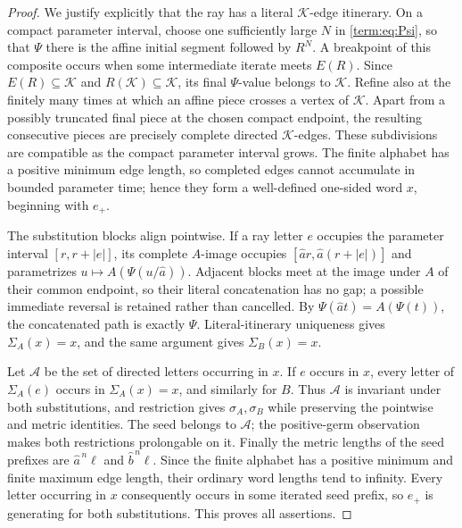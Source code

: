 \documentclass[11pt]{article}
\theoremstyle{definition}
\theoremstyle{remark}
\begin{document}
\begin{proof}
We justify explicitly that the ray has a literal \(\mathcal K\)-edge
itinerary.  On a compact parameter interval, choose one sufficiently large
\(N\) in \eqref{term:eq:Psi}, so that \(\Psi\) there is the affine initial
segment followed by \(R^N\).  A breakpoint of this composite occurs when
some intermediate iterate meets \(E(R)\).  Since
\(E(R)\subseteq\mathcal K\) and \(R(\mathcal K)\subseteq\mathcal K\), its
final \(\Psi\)-value belongs to \(\mathcal K\).  Refine also at the finitely
many times at which an affine piece crosses a vertex of \(\mathcal K\).
Apart from a possibly truncated final piece at the chosen compact endpoint,
the resulting consecutive pieces are precisely complete directed
\(\mathcal K\)-edges.  These subdivisions are compatible as the compact
parameter interval grows.  The finite alphabet has a positive minimum edge
length, so completed edges cannot accumulate in bounded parameter time;
hence they form a well-defined one-sided word \(x\), beginning with \(e_+\).

The substitution blocks align pointwise.  If a ray letter \(e\) occupies
the parameter interval \([r,r+|e|]\), its complete \(A\)-image occupies
\([\widehat a r,\widehat a(r+|e|)]\) and parametrizes
\(u\mapsto A(\Psi(u/\widehat a))\).  Adjacent blocks meet at the image under
\(A\) of their common endpoint, so their literal concatenation has no gap; a
possible immediate reversal is retained rather than cancelled.  By
\(\Psi(\widehat a t)=A(\Psi(t))\), the
concatenated path is exactly \(\Psi\).  Literal-itinerary uniqueness gives
\(\Sigma_A(x)=x\), and the same argument gives \(\Sigma_B(x)=x\).

Let \(\mathcal A\) be the set of directed letters occurring in \(x\).  If
\(e\) occurs in \(x\), every letter of \(\Sigma_A(e)\) occurs in
\(\Sigma_A(x)=x\), and similarly for \(B\).  Thus \(\mathcal A\) is
invariant under both substitutions, and restriction gives
\(\sigma_A,\sigma_B\) while preserving the pointwise and metric identities.
The seed belongs to \(\mathcal A\); the positive-germ observation makes both
restrictions prolongable on it.  Finally the metric lengths of the seed
prefixes are \(\widehat a^{\,n}\ell\) and
\(\widehat b^{\,n}\ell\).  Since the finite alphabet has a positive minimum
and finite maximum edge length, their ordinary word lengths tend to
infinity.  Every letter occurring in \(x\) consequently occurs in some
iterated seed prefix, so \(e_+\) is generating for both substitutions.
This proves all assertions.
\end{proof}
\end{document}
